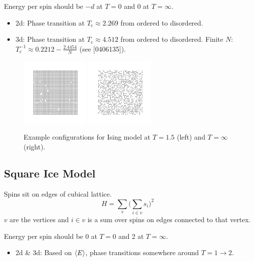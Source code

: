 \documentclass[11pt]{article}
\begin{document}
Energy per spin should be $-d$ at $T=0$ and 0 at $T=\infty$.

\begin{itemize}
    \item 2d: Phase transition at $T_\text{c}\approx 2.269$ from ordered to disordered.
    \item 3d: Phase transition at $T_\text{c}\approx 4.512$ from ordered to disordered. Finite $N$: $T_\text{c}^{-1}\approx 0.2212-\frac{2.4454}{N}$ (see [0406135]).
\end{itemize}

\begin{figure}[h]
    \centering
    \includegraphics[width=0.3\textwidth]{ising_T=150.png}
    \includegraphics[width=0.3\textwidth]{ising_T=inf.png}
    \caption{Example configurations for Ising model at $T=1.5$ (left) and $T=\infty$ (right).}
\end{figure}

\subsection{Square Ice Model}
Spins sit on edges of cubical lattice.
\begin{equation}
    H = \sum_v\Big(\sum_{i\in v}s_i\Big)^2
\end{equation}
$v$ are the vertices and $i\in v$ is a sum over spins on edges connected to that vertex.

Energy per spin should be 0 at $T=0$ and 2 at $T=\infty$.

\begin{itemize}
    \item 2d \& 3d: Based on $\ev{E}$, phase transitions somewhere around $T=1\to2$.
\end{itemize}
\end{document}
